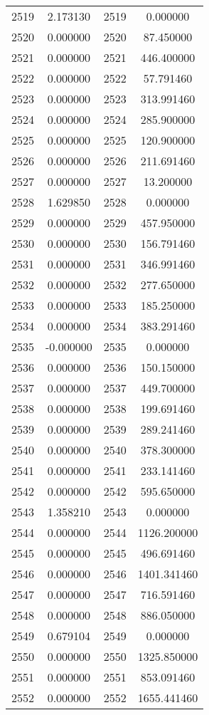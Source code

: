 \documentclass[12pt]{article}
\begin{document}
\begin{longtable}{@{}cccc@{}}
2519 & 2.173130 & 2519 & 0.000000 \\
2520 & 0.000000 & 2520 & 87.450000 \\
2521 & 0.000000 & 2521 & 446.400000 \\
2522 & 0.000000 & 2522 & 57.791460 \\
2523 & 0.000000 & 2523 & 313.991460 \\
2524 & 0.000000 & 2524 & 285.900000 \\
2525 & 0.000000 & 2525 & 120.900000 \\
2526 & 0.000000 & 2526 & 211.691460 \\
2527 & 0.000000 & 2527 & 13.200000 \\
2528 & 1.629850 & 2528 & 0.000000 \\
2529 & 0.000000 & 2529 & 457.950000 \\
2530 & 0.000000 & 2530 & 156.791460 \\
2531 & 0.000000 & 2531 & 346.991460 \\
2532 & 0.000000 & 2532 & 277.650000 \\
2533 & 0.000000 & 2533 & 185.250000 \\
2534 & 0.000000 & 2534 & 383.291460 \\
2535 & -0.000000 & 2535 & 0.000000 \\
2536 & 0.000000 & 2536 & 150.150000 \\
2537 & 0.000000 & 2537 & 449.700000 \\
2538 & 0.000000 & 2538 & 199.691460 \\
2539 & 0.000000 & 2539 & 289.241460 \\
2540 & 0.000000 & 2540 & 378.300000 \\
2541 & 0.000000 & 2541 & 233.141460 \\
2542 & 0.000000 & 2542 & 595.650000 \\
2543 & 1.358210 & 2543 & 0.000000 \\
2544 & 0.000000 & 2544 & 1126.200000 \\
2545 & 0.000000 & 2545 & 496.691460 \\
2546 & 0.000000 & 2546 & 1401.341460 \\
2547 & 0.000000 & 2547 & 716.591460 \\
2548 & 0.000000 & 2548 & 886.050000 \\
2549 & 0.679104 & 2549 & 0.000000 \\
2550 & 0.000000 & 2550 & 1325.850000 \\
2551 & 0.000000 & 2551 & 853.091460 \\
2552 & 0.000000 & 2552 & 1655.441460 \\

\end{longtable}
\end{document}
